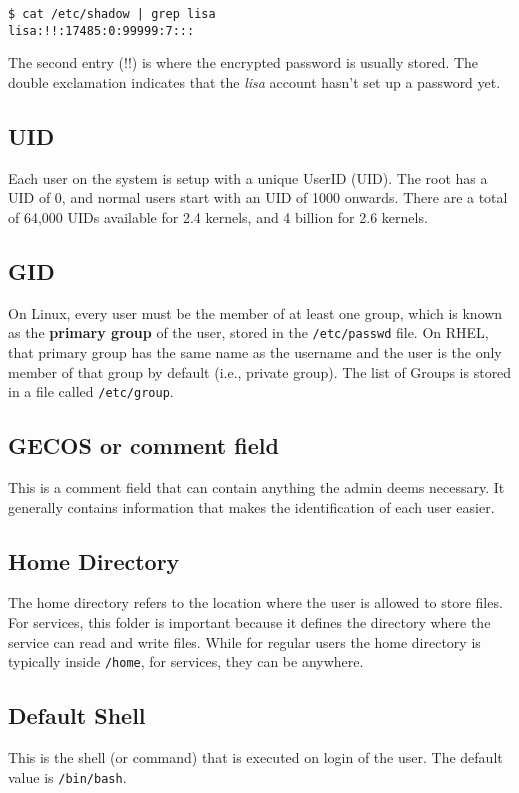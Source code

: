 \begin{verbatim}
$ cat /etc/shadow | grep lisa
lisa:!!:17485:0:99999:7:::
\end{verbatim} 

The second entry (!!) is where the encrypted password is usually stored. The double exclamation indicates that the \textit{lisa} account hasn't set up a password yet. 

\subsection{UID}
Each user on the system is setup with a unique UserID (UID). The root has a UID of 0, and normal users start with an UID of 1000 onwards. There are a total of 64,000 UIDs available for 2.4 kernels, and 4 billion for 2.6 kernels. 

\subsection{GID}
On Linux, every user must be the member of at least one group, which is known as the \textbf{primary group} of the user, stored in the \verb|/etc/passwd| file. On RHEL, that primary group has the same name as the username and the user is the only member of that group by default (i.e., private group). The list of Groups is stored in a file called \verb|/etc/group|.

\subsection{GECOS or comment field}
This is a comment field that can contain anything the admin deems necessary. It generally contains information that makes the identification of each user easier. 

\subsection{Home Directory}
The home directory refers to the location where the user is allowed to store files. For services, this folder is important because it defines the directory where the service can read and write files. While for regular users the home directory is typically inside \verb|/home|, for services, they can be anywhere.

\subsection{Default Shell}
This is the shell (or command) that is executed on login of the user. The default value is \verb|/bin/bash|.

